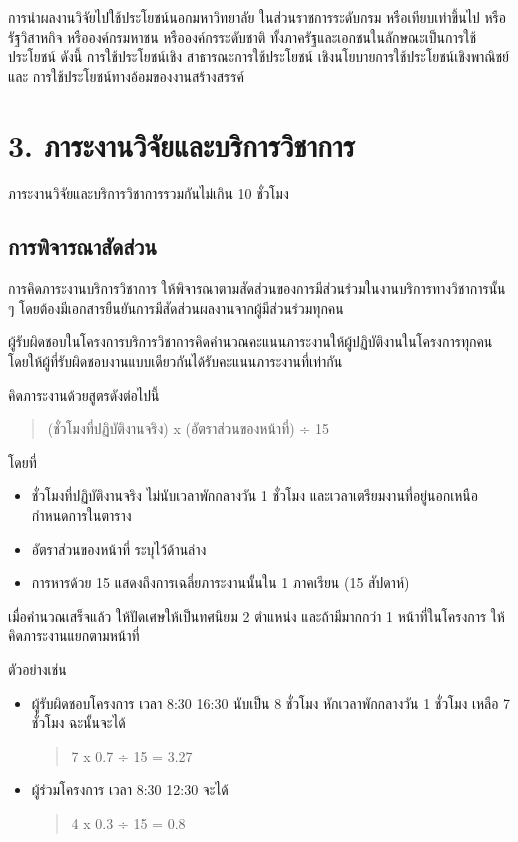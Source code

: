 \documentclass[a4paper,12pt,english]{sphinxmanual}
\begin{document}
การนำผลงานวิจัยไปใช้ประโยชน์นอกมหาวิทยาลัย ในส่วนราชการระดับกรม หรือเทียบเท่าขึ้นไป หรือรัฐวิสาหกิจ หรือองค์กรมหาชน หรือองค์กรระดับชาติ ทั้งภาครัฐและเอกชนในลักษณะเป็นการใช้ประโยชน์ ดังนี้ การใช้ประโยชน์เชิง สาธารณะการใช้ประโยชน์ เชิงนโยบายการใช้ประโยชน์เชิงพาณิชย์ และ การใช้ประโยชน์ทางอ้อมของงานสร้างสรรค์


\chapter{3. ภาระงานวิจัยและบริการวิชาการ}
\label{\detokenize{3service:id1}}\label{\detokenize{3service::doc}}
ภาระงานวิจัยและบริการวิชาการรวมกันไม่เกิน 10 ชั่วโมง


\section{การพิจารณาสัดส่วน}
\label{\detokenize{3service:id2}}
การคิดภาระงานบริการวิชาการ ให้พิจารณาตามสัดส่วนของการมีส่วนร่วมในงานบริการทางวิชาการนั้น ๆ โดยต้องมีเอกสารยืนยันการมีสัดส่วนผลงานจากผู้มีส่วนร่วมทุกคน

ผู้รับผิดชอบในโครงการบริการวิชาการคิดคำนวณคะแนนภาระงานให้ผู้ปฏิบัติงานในโครงการทุกคน โดยให้ผู้ที่รับผิดชอบงานแบบเดียวกันได้รับคะแนนภาระงานที่เท่ากัน

คิดภาระงานด้วยสูตรดังต่อไปนี้
\begin{quote}

(ชั่วโมงที่ปฏิบัติงานจริง) x (อัตราส่วนของหน้าที่) ÷ 15
\end{quote}

โดยที่
\begin{itemize}
\item {} 
ชั่วโมงที่ปฏิบัติงานจริง ไม่นับเวลาพักกลางวัน 1 ชั่วโมง และเวลาเตรียมงานที่อยู่นอกเหนือกำหนดการในตาราง

\item {} 
อัตราส่วนของหน้าที่ ระบุไว้ด้านล่าง

\item {} 
การหารด้วย 15 แสดงถึงการเฉลี่ยภาระงานนั้นใน 1 ภาคเรียน (15 สัปดาห์)

\end{itemize}

เมื่อคำนวณเสร็จแล้ว ให้ปัดเศษให้เป็นทศนิยม 2 ตำแหน่ง และถ้ามีมากกว่า 1 หน้าที่ในโครงการ ให้คิดภาระงานแยกตามหน้าที่

ตัวอย่างเช่น
\begin{itemize}
\item {} 
ผู้รับผิดชอบโครงการ เวลา 8:30 \sphinxhyphen{} 16:30 นับเป็น 8 ชั่วโมง หักเวลาพักกลางวัน 1 ชั่วโมง เหลือ 7 ชั่วโมง ฉะนั้นจะได้
\begin{quote}

7 x 0.7 ÷ 15 = 3.27
\end{quote}

\item {} 
ผู้ร่วมโครงการ เวลา 8:30 \sphinxhyphen{} 12:30 จะได้
\begin{quote}

4 x 0.3 ÷ 15 = 0.8
\end{quote}

\end{itemize}
\end{document}

